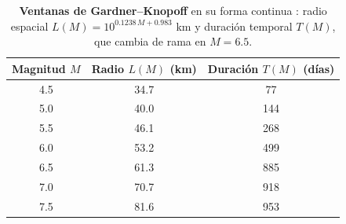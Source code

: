 \begin{table}[ht!]
  \centering
  \small
  \begin{tabular}{@{}ccc@{}}
    \toprule
    \textbf{Magnitud \(M\)} & \textbf{Radio \(L(M)\) (km)} & \textbf{Duración \(T(M)\) (días)} \\
    \midrule
    4.5                     & 34.7                         & 77                                \\
    5.0                     & 40.0                         & 144                               \\
    5.5                     & 46.1                         & 268                               \\
    6.0                     & 53.2                         & 499                               \\
    6.5                     & 61.3                         & 885                               \\
    7.0                     & 70.7                         & 918                               \\
    7.5                     & 81.6                         & 953                               \\
    \bottomrule
  \end{tabular}
  \caption[Ventanas de \textit{declustering} de Gardner--Knopoff]{\textbf{Ventanas de Gardner--Knopoff} en su forma continua \citep{vanstiphout2012declustering}: radio espacial \(L(M) = 10^{0.1238\,M + 0.983}\) km y duración temporal \(T(M)\), que cambia de rama en \(M = 6.5\).}
  \label{tab:gk-ventanas}
\end{table}
